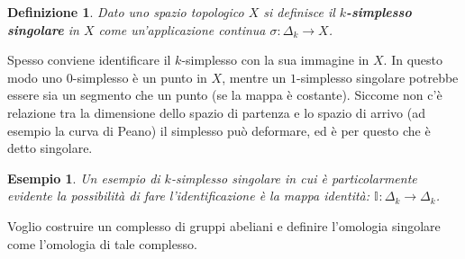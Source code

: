 \documentclass[10pt, twoside=false, x11names]{scrbook}
\newtheorem{definition}[theorem]{Definizione}
\newtheorem{example}[theorem]{Esempio}
\newcommand{\Id}[1][]{\mathbb{I}_#1}
\begin{document}
\begin{definition}
  Dato uno spazio topologico $ X $ si definisce il \textbf{$ k $-simplesso singolare}
  in $ X $ come un'applicazione continua $ \sigma: \Delta_k \to X $.
\end{definition}
Spesso conviene identificare il $ k $-simplesso con la sua immagine in $ X $.
In questo modo uno $ 0 $-simplesso è un punto in $ X $, mentre un $ 1 $-simplesso singolare potrebbe
essere sia un segmento che un punto (se la mappa è costante).
Siccome non c'è relazione tra la dimensione dello spazio di partenza e lo spazio di arrivo
(ad esempio la curva di Peano) il simplesso può deformare, ed è per questo che è detto singolare.

\begin{example}
  Un esempio di $ k $-simplesso singolare in cui è particolarmente evidente la possibilità di fare l'identificazione
  è la mappa identità: $ \Id{} \colon \Delta_k \to \Delta_k $.
\end{example}

Voglio costruire un complesso di gruppi abeliani e definire l'omologia singolare come l'omologia di tale complesso.
\end{document}
